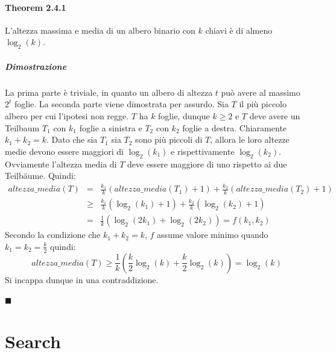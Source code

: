 \documentclass[a4paper]{book}
\newenvironment{mytheorem}[1]{\subsubsection*{Theorem #1}}{\begin{flushright}$\blacksquare$\end{flushright}}
\begin{document}
\begin{mytheorem}{2.4.1}
L'altezza massima e media di un albero binario con $k$ chiavi è di almeno $ \log_2 (k)$.
\paragraph*{Dimostrazione}
La prima parte è triviale, in quanto un albero di altezza $t$ può avere al massimo $2^t$ foglie. La seconda parte viene dimostrata per assurdo. Sia $T$ il più piccolo albero per cui l'ipotesi non regge. $T$ ha $k$ foglie, dunque $k \geq 2$ e $T$ deve avere un Teilbaum $T_1$ con $k_1$ foglie a sinistra e $T_2$ con $k_2$ foglie a destra. Chiaramente $k_1+k_2=k$. Dato che sia $T_1$ sia $T_2$ sono più piccoli di $T$, allora le loro altezze medie devono essere maggiori di $\log_2(k_1)$ e rispettivamente $\log_2 (k_2)$. Ovviamente l'altezza media di $T$ deve essere maggiore di uno rispetto ai due Teilbäume. Quindi:
\begin{eqnarray}
 altezza\_media(T) &=&  \frac{k_1}{k}(altezza\_media(T_1)+1)+\frac{k_2}{k}(altezza\_media(T_2)+1)      \nonumber \\
   &\geq & \frac{k_1}{k}(\log_2(k_1)+1)+\frac{k_2}{k}(\log_2(k_2)+1) \nonumber \\
   &=&\frac{1}{k}(\log_2(2k_1)+\log_2(2k_2)) = f(k_1,k_2)
\end{eqnarray}
Secondo la condizione che $k_1+k_2=k$, $f$ assume valore minimo quando $k_1=k_2=\frac{k}{2}$ quindi:
$$ altezza\_media(T) \geq \frac{1}{k}\left(\frac{k}{2} \log_2(k)+\frac{k}{2} \log_2(k)\right)=\log_2 (k)$$
Si incappa dunque in una contraddizione.
\end{mytheorem}
\chapter{Search}
\end{document}
